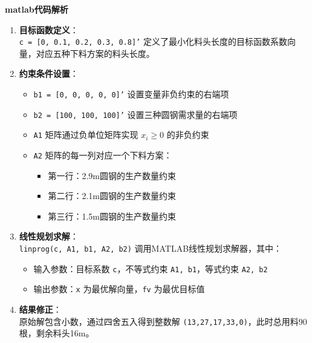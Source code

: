        \begin{notebox}{\textbf{matlab代码解析}}
            \begin{enumerate}
                \item \textbf{目标函数定义}：\\
                \texttt{c = [0, 0.1, 0.2, 0.3, 0.8]'} 定义了最小化料头长度的目标函数系数向量，对应五种下料方案的料头长度。
            
                \item \textbf{约束条件设置}：
                \begin{itemize}
                    \item \texttt{b1 = [0, 0, 0, 0, 0]'} 设置变量非负约束的右端项
                    \item \texttt{b2 = [100, 100, 100]'} 设置三种圆钢需求量的右端项
                    \item \texttt{A1} 矩阵通过负单位矩阵实现 $x_i \geq 0$ 的非负约束
                    \item \texttt{A2} 矩阵的每一列对应一个下料方案：
                    \begin{itemize}
                        \item 第一行：2.9m圆钢的生产数量约束
                        \item 第二行：2.1m圆钢的生产数量约束
                        \item 第三行：1.5m圆钢的生产数量约束
                    \end{itemize}
                \end{itemize}
            
                \item \textbf{线性规划求解}：\\
                \texttt{linprog(c, A1, b1, A2, b2)} 调用MATLAB线性规划求解器，其中：
                \begin{itemize}
                    \item 输入参数：目标系数 \texttt{c}，不等式约束 \texttt{A1, b1}，等式约束 \texttt{A2, b2}
                    \item 输出参数：\texttt{x} 为最优解向量，\texttt{fv} 为最优目标值
                \end{itemize}
            
                \item \textbf{结果修正}：\\
                原始解包含小数，通过四舍五入得到整数解 \texttt{(13,27,17,33,0)}，此时总用料90根，剩余料头16m。
            \end{enumerate}
        \end{notebox}
        
